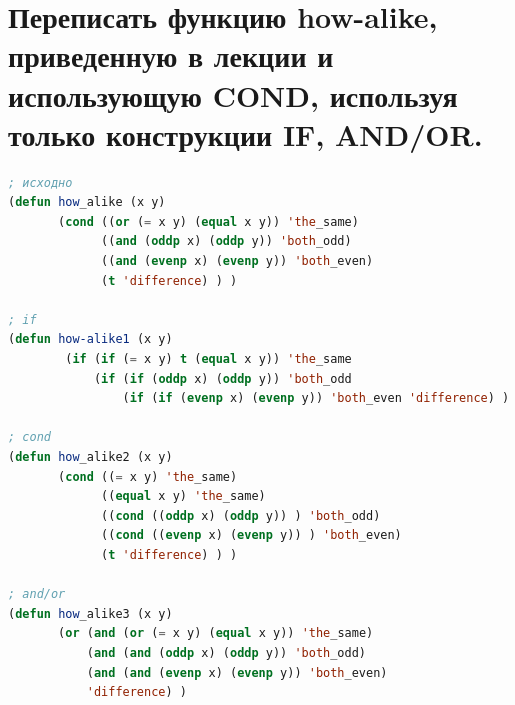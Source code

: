 \documentclass[12pt]{report}
\begin{document}
\section{Переписать функцию how-alike, приведенную в лекции и использующую COND, используя только конструкции IF, AND/OR.}

\begin{lstlisting}[language=Lisp]
; исходно
(defun how_alike (x y)
       (cond ((or (= x y) (equal x y)) 'the_same)
             ((and (oddp x) (oddp y)) 'both_odd)
             ((and (evenp x) (evenp y)) 'both_even)
             (t 'difference) ) )

; if
(defun how-alike1 (x y) 
        (if (if (= x y) t (equal x y)) 'the_same
            (if (if (oddp x) (oddp y)) 'both_odd 
                (if (if (evenp x) (evenp y)) 'both_even 'difference) ) ) )

; cond         
(defun how_alike2 (x y)
       (cond ((= x y) 'the_same)
             ((equal x y) 'the_same)
             ((cond ((oddp x) (oddp y)) ) 'both_odd)
             ((cond ((evenp x) (evenp y)) ) 'both_even)
             (t 'difference) ) )

; and/or
(defun how_alike3 (x y)
       (or (and (or (= x y) (equal x y)) 'the_same)
           (and (and (oddp x) (oddp y)) 'both_odd)
           (and (and (evenp x) (evenp y)) 'both_even)
           'difference) )
\end{lstlisting}



	
\end{document}

